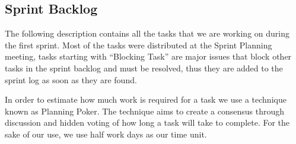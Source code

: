 \subsection{Sprint Backlog}
The following description contains all the tasks that we are working on during the first sprint.
Most of the tasks were distributed at the Sprint Planning meeting, tasks starting with ``Blocking Task'' are major issues that block other tasks in the sprint backlog and must be resolved, thus they are added to the sprint log as soon as they are found.

In order to estimate how much work is required for a task we use a technique known as Planning Poker.
The technique aims to create a consensus through discussion and hidden voting of how long a task will take to complete.
For the sake of our use, we use half work days as our time unit.


